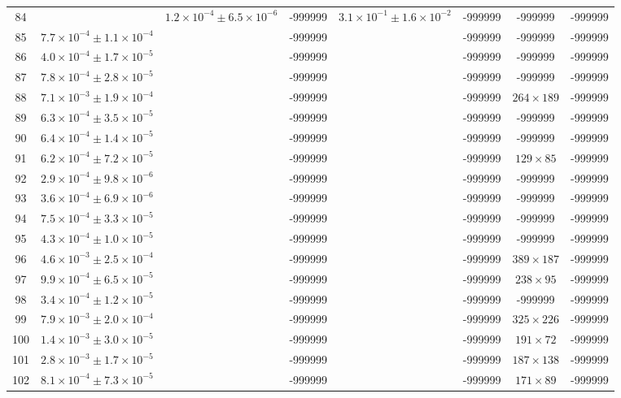 \begin{table}
\begin{tabular}{cccccccc}
84 &  & $1.2\times10^{-4}\pm 6.5\times10^{-6}$ & -999999 & $3.1\times10^{-1}\pm 1.6\times10^{-2}$ & -999999 & -999999 & -999999 \\
85 & $7.7\times10^{-4}\pm 1.1\times10^{-4}$ &  & -999999 &  & -999999 & -999999 & -999999 \\
86 & $4.0\times10^{-4}\pm 1.7\times10^{-5}$ &  & -999999 &  & -999999 & -999999 & -999999 \\
87 & $7.8\times10^{-4}\pm 2.8\times10^{-5}$ &  & -999999 &  & -999999 & -999999 & -999999 \\
88 & $7.1\times10^{-3}\pm 1.9\times10^{-4}$ &  & -999999 &  & -999999 & $264\times 189$ & -999999 \\
89 & $6.3\times10^{-4}\pm 3.5\times10^{-5}$ &  & -999999 &  & -999999 & -999999 & -999999 \\
90 & $6.4\times10^{-4}\pm 1.4\times10^{-5}$ &  & -999999 &  & -999999 & -999999 & -999999 \\
91 & $6.2\times10^{-4}\pm 7.2\times10^{-5}$ &  & -999999 &  & -999999 & $129\times 85$ & -999999 \\
92 & $2.9\times10^{-4}\pm 9.8\times10^{-6}$ &  & -999999 &  & -999999 & -999999 & -999999 \\
93 & $3.6\times10^{-4}\pm 6.9\times10^{-6}$ &  & -999999 &  & -999999 & -999999 & -999999 \\
94 & $7.5\times10^{-4}\pm 3.3\times10^{-5}$ &  & -999999 &  & -999999 & -999999 & -999999 \\
95 & $4.3\times10^{-4}\pm 1.0\times10^{-5}$ &  & -999999 &  & -999999 & -999999 & -999999 \\
96 & $4.6\times10^{-3}\pm 2.5\times10^{-4}$ &  & -999999 &  & -999999 & $389\times 187$ & -999999 \\
97 & $9.9\times10^{-4}\pm 6.5\times10^{-5}$ &  & -999999 &  & -999999 & $238\times 95$ & -999999 \\
98 & $3.4\times10^{-4}\pm 1.2\times10^{-5}$ &  & -999999 &  & -999999 & -999999 & -999999 \\
99 & $7.9\times10^{-3}\pm 2.0\times10^{-4}$ &  & -999999 &  & -999999 & $325\times 226$ & -999999 \\
100 & $1.4\times10^{-3}\pm 3.0\times10^{-5}$ &  & -999999 &  & -999999 & $191\times 72$ & -999999 \\
101 & $2.8\times10^{-3}\pm 1.7\times10^{-5}$ &  & -999999 &  & -999999 & $187\times 138$ & -999999 \\
102 & $8.1\times10^{-4}\pm 7.3\times10^{-5}$ &  & -999999 &  & -999999 & $171\times 89$ & -999999 \\

\end{tabular}
\end{table}
